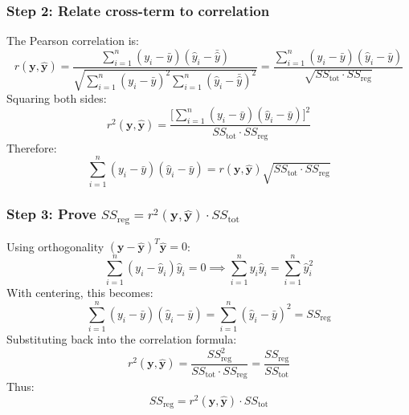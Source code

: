 \documentclass{article}
\begin{document}
\subsubsection*{Step 2: Relate cross-term to correlation}
The Pearson correlation is:
\begin{equation}
    r(\mathbf{y}, \hat{\mathbf{y}}) = \frac{\sum_{i=1}^n (y_i - \bar{y})(\hat{y}_i - \bar{\hat{y}})}{\sqrt{\sum_{i=1}^n (y_i - \bar{y})^2 \sum_{i=1}^n (\hat{y}_i - \bar{\hat{y}})^2}} = \frac{\sum_{i=1}^n (y_i - \bar{y})(\hat{y}_i - \bar{y})}{\sqrt{SS_{\text{tot}} \cdot SS_{\text{reg}}}}
\end{equation}
Squaring both sides:
\begin{equation}
    r^2(\mathbf{y}, \hat{\mathbf{y}}) = \frac{\big[\sum_{i=1}^n (y_i - \bar{y})(\hat{y}_i - \bar{y})\big]^2}{SS_{\text{tot}} \cdot SS_{\text{reg}}}
\end{equation}
Therefore:
\begin{equation}
    \sum_{i=1}^n (y_i - \bar{y})(\hat{y}_i - \bar{y}) = r(\mathbf{y}, \hat{\mathbf{y}})\sqrt{SS_{\text{tot}} \cdot SS_{\text{reg}}}
\end{equation}

\subsubsection*{Step 3: Prove $SS_{\text{reg}} = r^2(\mathbf{y}, \hat{\mathbf{y}}) \cdot SS_{\text{tot}}$}
Using orthogonality $(\mathbf{y} - \hat{\mathbf{y}})^T\hat{\mathbf{y}} = 0$:
\begin{equation}
    \sum_{i=1}^n (y_i - \hat{y}_i)\hat{y}_i = 0 \implies \sum_{i=1}^n y_i\hat{y}_i = \sum_{i=1}^n \hat{y}_i^2
\end{equation}
With centering, this becomes:
\begin{equation}
    \sum_{i=1}^n (y_i - \bar{y})(\hat{y}_i - \bar{y}) = \sum_{i=1}^n (\hat{y}_i - \bar{y})^2 = SS_{\text{reg}}
\end{equation}
Substituting back into the correlation formula:
\begin{equation}
    r^2(\mathbf{y}, \hat{\mathbf{y}}) = \frac{SS_{\text{reg}}^2}{SS_{\text{tot}} \cdot SS_{\text{reg}}} = \frac{SS_{\text{reg}}}{SS_{\text{tot}}}
\end{equation}
Thus:
\begin{equation}
    \boxed{SS_{\text{reg}} = r^2(\mathbf{y}, \hat{\mathbf{y}}) \cdot SS_{\text{tot}}}
\end{equation}
\end{document}
